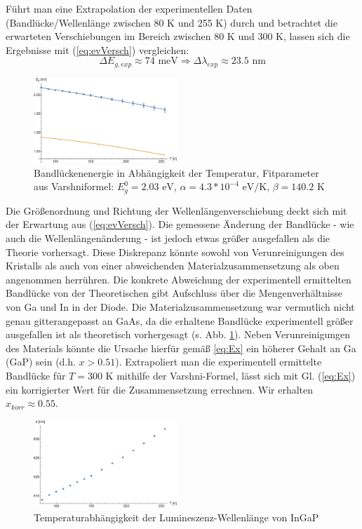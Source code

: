 \documentclass[aps,twocolumn,secnumarabic,nobalancelastpage,amsmath,amssymb,
nofootinbib,superscriptaddress]{revtex4-1}
\begin{document}
Führt man eine Extrapolation der experimentellen Daten (Bandlücke/Wellenlänge zwischen 80 K und 255 K) durch und
betrachtet die erwarteten Verschiebungen im Bereich zwischen 80 K und 300 K, lassen sich die Ergebnisse mit (\ref{eq:evVersch})
vergleichen:
\begin{equation}
  \Delta E_{g,exp}\approx 74\text{ meV} \Rightarrow \Delta\lambda_{exp}\approx 23.5\text{ nm}
   \label{eq:expVersch}
\end{equation}

\begin{figure}[t]
  \centering
  \includegraphics[width=0.48\textwidth]{../Messung/energtemp.eps}
  \caption{\label{fig:EgapT} Bandlückenenergie in Abhängigkeit der Temperatur, Fitparameter
  aus Varshniformel: $E_g^0= 2.03 \text{ eV}$, $\alpha = 4.3*10^{-4}\text{ eV/K}$, $\beta = 140.2 \text{ K}$}
\end{figure}

\noindent Die Größenordnung und Richtung der Wellenlängenverschiebung deckt sich mit der Erwartung aus (\ref{eq:evVersch}).
Die gemessene Änderung der Bandlücke - wie auch die Wellenlängenänderung - ist jedoch etwas größer ausgefallen als die Theorie vorhersagt.
Diese Diskrepanz könnte sowohl von Verunreinigungen des Kristalls als auch von einer abweichenden Materialzusammensetzung als oben angenommen
herrühren. Die konkrete Abweichung der experimentell ermittelten Bandlücke von der Theoretischen gibt Aufschluss über die Mengenverhältnisse von
Ga und In in der Diode. Die Materialzusammensetzung war vermutlich nicht genau gitterangepasst an GaAs, da die erhaltene
Bandlücke experimentell größer ausgefallen ist als theoretisch vorhergesagt (s. Abb. \ref{fig:EgapT}). Neben Verunreinigungen des Materials könnte
die Ursache hierfür gemäß \ref{eq:Ex} ein höherer Gehalt an Ga (GaP) sein (d.h. $x>0.51$).
Extrapoliert man die experimentell ermittelte Bandlücke für $T=300\text{ K}$ mithilfe der Varshni-Formel, lässt sich mit Gl. (\ref{eq:Ex})
ein korrigierter Wert für die Zusammensetzung errechnen. Wir erhalten $x_{korr}\approx 0.55$.

\begin{figure}[h]
  \centering
  \includegraphics[width=0.48\textwidth]{../Messung/peaktemp.eps}
  \caption{\label{fig:lamT} Temperaturabhängigkeit der Lumineszenz-Wellenlänge von InGaP}
\end{figure}
\end{document}
